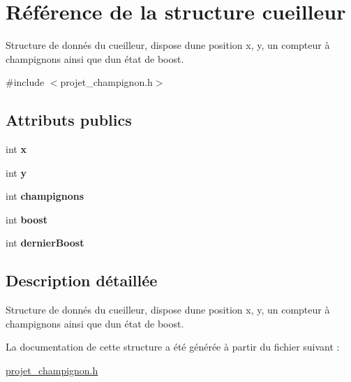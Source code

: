 \hypertarget{structcueilleur}{}\section{Référence de la structure cueilleur}
\label{structcueilleur}


Structure de donnés du cueilleur, dispose d\textquotesingle{}une position x, y, un compteur à champignons ainsi que d\textquotesingle{}un état de boost.  




{\ttfamily \#include $<$projet\+\_\+champignon.\+h$>$}

\subsection*{Attributs publics}
\begin{DoxyCompactItemize}
\item 
\mbox{\label{structcueilleur_a37b7e8eca74adf2930d89c1fc057a39c}} 
int {\bfseries x}
\item 
\mbox{\label{structcueilleur_a0f7c1ecf6b0c121ed6e906d9f881c48b}} 
int {\bfseries y}
\item 
\mbox{\label{structcueilleur_a3563c77c30c0260a9effd513d4f2a298}} 
int {\bfseries champignons}
\item 
\mbox{\label{structcueilleur_adf89888a8c59b48c28d08985b503dc07}} 
int {\bfseries boost}
\item 
\mbox{\label{structcueilleur_a145fbf811b7e40fa8c52ffc5af03c374}} 
int {\bfseries dernier\+Boost}
\end{DoxyCompactItemize}


\subsection{Description détaillée}
Structure de donnés du cueilleur, dispose d\textquotesingle{}une position x, y, un compteur à champignons ainsi que d\textquotesingle{}un état de boost. 

La documentation de cette structure a été générée à partir du fichier suivant \+:\begin{DoxyCompactItemize}
\item 
\hyperlink{projet__champignon_8h}{projet\+\_\+champignon.\+h}\end{DoxyCompactItemize}
